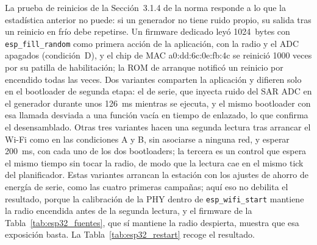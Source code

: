 La prueba de reinicios de la Sección~3.1.4 de la norma responde a lo que
la estadística anterior no puede: si un generador no tiene ruido propio,
su salida tras un reinicio en frío debe repetirse. Un firmware dedicado
leyó 1024~bytes con \texttt{esp\_fill\_random} como primera acción de la
aplicación, con la radio y el ADC apagados (condición~D), y el chip de MAC
a0:dd:6c:0e:fb:4c se reinició 1000 veces por su patilla de habilitación;
la ROM de arranque notificó un reinicio por encendido todas las veces. Dos
variantes comparten la aplicación y difieren solo en el bootloader de
segunda etapa: el de serie, que inyecta ruido del SAR ADC en el generador
durante unos 126~ms mientras se ejecuta, y el mismo bootloader con esa
llamada desviada a una función vacía en tiempo de enlazado, lo que
confirma el desensamblado. Otras tres variantes hacen una segunda lectura
tras arrancar el Wi-Fi como en las condiciones A y B, sin asociarse a
ninguna red, y esperar 200~ms, con cada uno de los dos bootloaders; la
tercera es un control que espera el mismo tiempo sin tocar la radio, de
modo que la lectura cae en el mismo tick del planificador. Estas
variantes arrancan la estación con los ajustes de ahorro de energía de
serie, como las cuatro primeras campañas; aquí eso no debilita el
resultado, porque la calibración de la PHY dentro de
\texttt{esp\_wifi\_start} mantiene la radio encendida antes de la
segunda lectura, y el firmware de la Tabla~\ref{tab:esp32_fuentes}, que
sí mantiene la radio despierta, muestra que esa exposición basta. La
Tabla~\ref{tab:esp32_restart} recoge el resultado.

